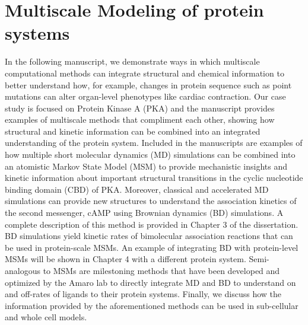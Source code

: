 \documentclass[12pt]{ucsddissertation}
\begin{document}





\chapter{Multiscale Modeling of protein systems}\label{first:chapter}
\vspace*{-1.2cm}
In the following manuscript, we demonstrate ways in which multiscale computational methods can integrate structural and chemical information to better understand how, for example, changes in protein sequence such as point mutations can alter organ-level phenotypes like cardiac contraction. Our case study is focused on Protein Kinase A (PKA) and the manuscript provides examples of multiscale methods that compliment each other, showing how structural and kinetic information can be combined into an integrated understanding of the protein system. Included in the manuscripts are examples of how multiple short molecular dynamics (MD) simulations can be combined into an atomistic Markov State Model (MSM) to provide mechanistic insights and kinetic information about important structural transitions in the cyclic nucleotide binding domain (CBD) of PKA. Moreover, classical and accelerated  MD simulations can provide new structures to understand the association kinetics of the second messenger, cAMP using Brownian dynamics (BD) simulations. A complete description of this method is provided in Chapter 3 of the dissertation. BD simulations yield kinetic rates of bimolecular association reactions that can be used in protein-scale MSMs. An example of integrating BD with protein-level MSMs will be shown in Chapter 4 with a different protein system. Semi-analogous to MSMs are milestoning methods that have been developed and optimized by the Amaro lab to directly integrate MD and BD to understand on and off-rates of ligands to their protein systems. Finally, we discuss how the information provided by the aforementioned methods can be used in sub-cellular and whole cell models. 
\end{document}
